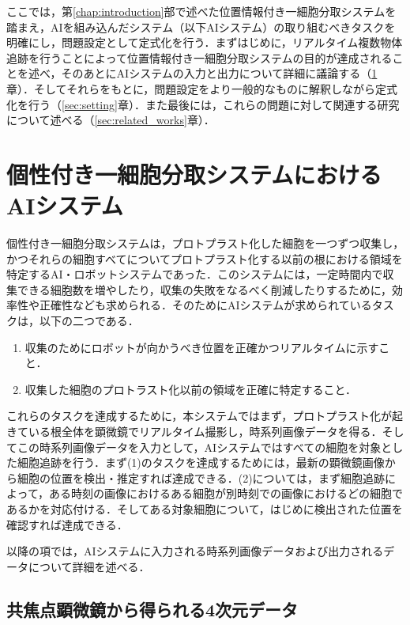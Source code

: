 \thispagestyle{fancy2}

ここでは，第\ref{chap:introduction}部で述べた位置情報付き一細胞分取システムを踏まえ，AIを組み込んだシステム（以下AIシステム）の取り組むべきタスクを明確にし，問題設定として定式化を行う．まずはじめに，リアルタイム複数物体追跡を行うことによって位置情報付き一細胞分取システムの目的が達成されることを述べ，そのあとにAIシステムの入力と出力について詳細に議論する（\ref{sec:ai_system}章）．そしてそれらをもとに，問題設定をより一般的なものに解釈しながら定式化を行う（\ref{sec:setting}章）．また最後には，これらの問題に対して関連する研究について述べる（\ref{sec:related_works}章）．

\section{個性付き一細胞分取システムにおけるAIシステム}

\label{sec:ai_system}
個性付き一細胞分取システムは，プロトプラスト化した細胞を一つずつ収集し，かつそれらの細胞すべてについてプロトプラスト化する以前の根における領域を特定するAI・ロボットシステムであった．このシステムには，一定時間内で収集できる細胞数を増やしたり，収集の失敗をなるべく削減したりするために，効率性や正確性なども求められる．そのためにAIシステムが求められているタスクは，以下の二つである．
\begin{enumerate}[label=(\arabic*)]
    \item 収集のためにロボットが向かうべき位置を正確かつリアルタイムに示すこと．
    \item 収集した細胞のプロトラスト化以前の領域を正確に特定すること．
\end{enumerate}

これらのタスクを達成するために，本システムではまず，プロトプラスト化が起きている根全体を顕微鏡でリアルタイム撮影し，時系列画像データを得る．そしてこの時系列画像データを入力として，AIシステムではすべての細胞を対象とした細胞追跡を行う．まず(1)のタスクを達成するためには，最新の顕微鏡画像から細胞の位置を検出・推定すれば達成できる．(2)については，まず細胞追跡によって，ある時刻の画像におけるある細胞が別時刻での画像におけるどの細胞であるかを対応付ける．そしてある対象細胞について，はじめに検出された位置を確認すれば達成できる．

以降の項では，AIシステムに入力される時系列画像データおよび出力されるデータについて詳細を述べる．

    \subsection{共焦点顕微鏡から得られる4次元データ}
    \label{sec:}

